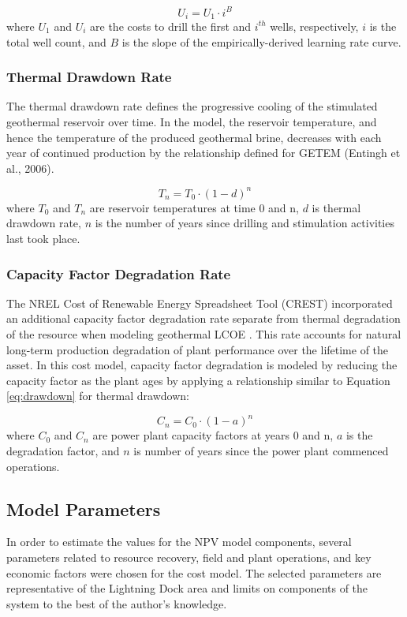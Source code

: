 \begin{equation}
    \label{eq:learning_rate}
    U_i = U_1 \cdot i^B
\end{equation}
where $U_1$ and $U_i$ are the costs to drill the first and $i^{th}$ wells, respectively, $i$ is the total well count, and $B$ is the slope of the empirically-derived learning rate curve.

\subsubsection{Thermal Drawdown Rate}\label{ch4:drawdown_rate}
The thermal drawdown rate defines the progressive cooling of the stimulated geothermal reservoir over time. In the model, the reservoir temperature, and hence the temperature of the produced geothermal brine, decreases with each year of continued production by the relationship defined for GETEM (Entingh et al., 2006).

\begin{equation}
    \label{eq:drawdown}
    T_n = T_0 \cdot (1-d)^n
\end{equation}
where $T_0$ and $T_n$ are reservoir temperatures at time 0 and n, $d$ is thermal drawdown rate, $n$ is the number of years since drilling and stimulation activities last took place.

\subsubsection{Capacity Factor Degradation Rate}\label{ch4:degrade_rate}
The NREL Cost of Renewable Energy Spreadsheet Tool (CREST) incorporated an additional capacity factor degradation rate separate from thermal degradation of the resource when modeling geothermal LCOE \citep{gifford_crest_2013}. This rate accounts for natural long-term production degradation of plant performance over the lifetime of the asset. In this cost model, capacity factor degradation is modeled by reducing the capacity factor as the plant ages by applying a relationship similar to Equation \ref{eq:drawdown} for thermal drawdown:

\begin{equation}
    \label{eq:degradation}
    C_n = C_0 \cdot (1-a)^n
\end{equation}
where $C_0$ and $C_n$ are power plant capacity factors at years 0 and n, $a$ is the degradation factor, and $n$ is number of years since the power plant commenced operations.

\subsection{Model Parameters}\label{ch4:cm_params}
In order to estimate the values for the NPV model components, several parameters related to resource recovery, field and plant operations, and key economic factors were chosen for the cost model. The selected parameters are representative of the Lightning Dock area and limits on components of the system to the best of the author's knowledge.

